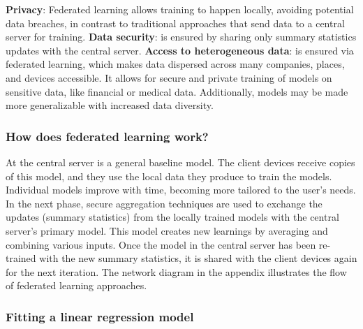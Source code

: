 \documentclass[
]{article}
\begin{document}
\textbf{Privacy}: Federated learning allows training to happen locally,
avoiding potential data breaches, in contrast to traditional approaches
that send data to a central server for training.\newline
\textbf{Data security}: is ensured by sharing only summary statistics
updates with the central server.\newline
\textbf{Access to heterogeneous data}: is ensured via federated
learning, which makes data dispersed across many companies, places, and
devices accessible. It allows for secure and private training of models
on sensitive data, like financial or medical data. Additionally, models
may be made more generalizable with increased data diversity.

\hypertarget{how-does-federated-learning-work}{%
\subsubsection{How does federated learning
work?}\label{how-does-federated-learning-work}}

At the central server is a general baseline model. The client devices
receive copies of this model, and they use the local data they produce
to train the models. Individual models improve with time, becoming more
tailored to the user's needs. In the next phase, secure aggregation
techniques are used to exchange the updates (summary statistics) from
the locally trained models with the central server's primary model. This
model creates new learnings by averaging and combining various inputs.
Once the model in the central server has been re-trained with the new
summary statistics, it is shared with the client devices again for the
next iteration. The network diagram in the appendix illustrates the flow
of federated learning approaches.

\hypertarget{fitting-a-linear-regression-model}{%
\subsubsection{Fitting a linear regression
model}\label{fitting-a-linear-regression-model}}
\end{document}
